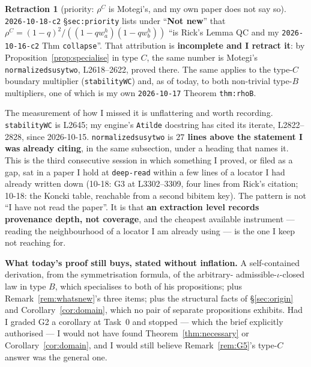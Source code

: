 \documentclass[11pt]{article}
\theoremstyle{definition}
\newtheorem{retr}[thm]{Retraction}
\begin{document}
\begin{retr}[priority: $\rho^{C}$ is Motegi's, and my own paper does not say so]
\label{retr:priority}
\texttt{2026-10-18-c2} \S\texttt{sec:priority} lists under ``\textbf{Not new}''
that $\rho^{C}=(1-q)^{2}/((1-qw_a^{h})(1-qw_b^{h}))$ ``is Rick's Lemma QC and my
\texttt{2026-10-16-c2} Thm \texttt{collapse}''.  That attribution is
\textbf{incomplete and I retract it}: by Proposition~\ref{prop:specialise} in
type $C$, the same number is Motegi's \texttt{normalizedsusytwo}, L2618--2622,
proved there.  The same applies to the type-$C$ boundary multiplier
(\texttt{stabilityWC}) and, as of today, to both non-trivial type-$B$
multipliers, one of which is my own \texttt{2026-10-17} Theorem
\texttt{thm:rhoB}.

The measurement of how I missed it is unflattering and worth recording.
\texttt{stabilityWC} is L2645; my engine's \texttt{Atilde} docstring has cited
its iterate, L2822--2828, since 2026-10-15.  \texttt{normalizedsusytwo} is
\textbf{$27$ lines above the statement I was already citing}, in the same
subsection, under a heading that names it.  This is the third consecutive
session in which something I proved, or filed as a gap, sat in a paper I hold at
\texttt{deep-read} within a few lines of a locator I had already written down
(10-18: G3 at L3302--3309, four lines from Rick's citation; 10-18: the Koncki
table, reachable from a second bibitem key).  The pattern is not ``I have not
read the paper''.  It is that \textbf{an extraction level records provenance
depth, not coverage}, and the cheapest available instrument --- reading the
neighbourhood of a locator I am already using --- is the one I keep not reaching
for.

\textbf{What today's proof still buys, stated without inflation.}  A
self-contained derivation, from the symmetrisation formula, of the arbitrary-%
admissible-$\iota$-closed law in type $B$, which specialises to both of his
propositions; plus Remark~\ref{rem:whatsnew}'s three items; plus the structural
facts of \S\ref{sec:origin} and Corollary~\ref{cor:domain}, which no pair of
separate propositions exhibits.  Had I graded G2 a corollary at Task~0 and
stopped --- which the brief explicitly authorised --- I would not have found
Theorem~\ref{thm:necessary} or Corollary~\ref{cor:domain}, and I would still
believe Remark~\ref{rem:G5}'s type-$C$ answer was the general one.
\end{retr}

\end{document}
